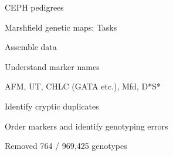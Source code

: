 \documentclass[aspectratio=169,12pt,t]{beamer}
\begin{document}
\begin{frame}[c]{CEPH pedigrees}


\end{frame}




\begin{frame}{Marshfield genetic maps: Tasks}

\bbi
\item Assemble data

\item Understand marker names

  \bi
  \item[] AFM, UT, CHLC (GATA etc.), Mfd, D*S*
  \ei

\item Identify cryptic duplicates

\item Order markers and identify genotyping errors

  \bi
  \item[] Removed 764 / 969,425 genotypes
  \ei
\ei

\end{frame}
\end{document}
